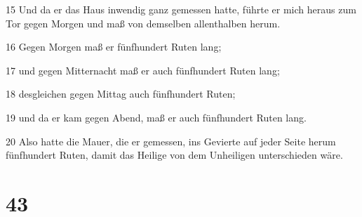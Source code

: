 \par 15 Und da er das Haus inwendig ganz gemessen hatte, führte er mich heraus zum Tor gegen Morgen und maß von demselben allenthalben herum.
\par 16 Gegen Morgen maß er fünfhundert Ruten lang;
\par 17 und gegen Mitternacht maß er auch fünfhundert Ruten lang;
\par 18 desgleichen gegen Mittag auch fünfhundert Ruten;
\par 19 und da er kam gegen Abend, maß er auch fünfhundert Ruten lang.
\par 20 Also hatte die Mauer, die er gemessen, ins Gevierte auf jeder Seite herum fünfhundert Ruten, damit das Heilige von dem Unheiligen unterschieden wäre.

\chapter{43}

